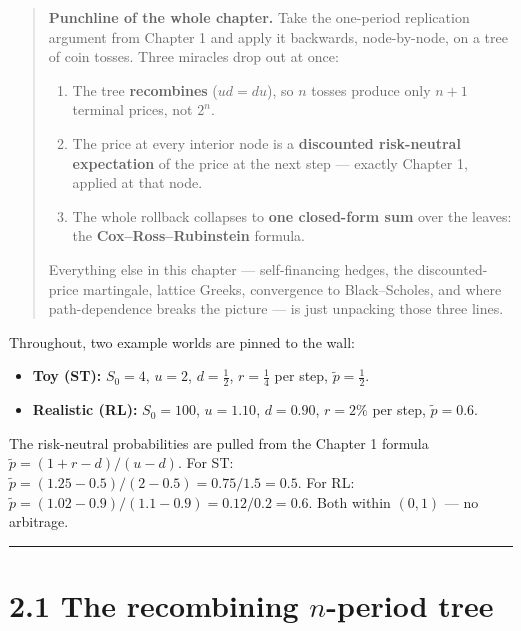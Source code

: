 \documentclass[
  10pt,
  twoside]{book}
\providecommand{\tightlist}{%
  \setlength{\itemsep}{0pt}\setlength{\parskip}{0pt}}
\begin{document}
\begin{quote}
\textbf{Punchline of the whole chapter.} Take the one-period replication
argument from Chapter 1 and apply it backwards, node-by-node, on a tree
of coin tosses. Three miracles drop out at once:

\begin{enumerate}
\def\labelenumi{\arabic{enumi}.}
\tightlist
\item
  The tree \textbf{recombines} (\(ud = du\)), so \(n\) tosses produce
  only \(n+1\) terminal prices, not \(2^n\).
\item
  The price at every interior node is a \textbf{discounted risk-neutral
  expectation} of the price at the next step --- exactly Chapter 1,
  applied at that node.
\item
  The whole rollback collapses to \textbf{one closed-form sum} over the
  leaves: the \textbf{Cox--Ross--Rubinstein} formula.
\end{enumerate}

Everything else in this chapter --- self-financing hedges, the
discounted-price martingale, lattice Greeks, convergence to
Black--Scholes, and where path-dependence breaks the picture --- is just
unpacking those three lines.
\end{quote}

Throughout, two example worlds are pinned to the wall:

\begin{itemize}
\tightlist
\item
  \textbf{Toy (ST):} \(S_0=4\), \(u=2\), \(d=\tfrac12\), \(r=\tfrac14\)
  per step, \(\tilde p=\tfrac12\).
\item
  \textbf{Realistic (RL):} \(S_0=100\), \(u=1.10\), \(d=0.90\),
  \(r=2\%\) per step, \(\tilde p=0.6\).
\end{itemize}

The risk-neutral probabilities are pulled from the Chapter 1 formula
\(\tilde p=(1+r-d)/(u-d)\). For ST:
\(\tilde p=(1.25-0.5)/(2-0.5)=0.75/1.5=0.5\). For RL:
\(\tilde p=(1.02-0.9)/(1.1-0.9)=0.12/0.2=0.6\). Both within \((0,1)\)
--- no arbitrage.

\begin{center}\rule{0.5\linewidth}{0.5pt}\end{center}

\section{\texorpdfstring{2.1 The recombining \(n\)-period
tree}{2.1 The recombining n-period tree}}\label{the-recombining-n-period-tree}
\end{document}
